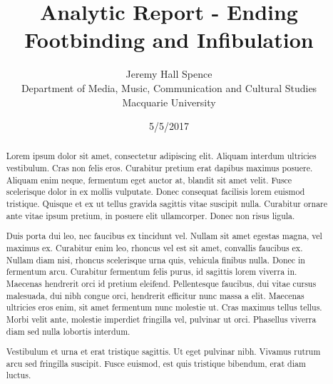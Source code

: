 \documentclass[twoside, 11pt]{article}
\title {Analytic Report - Ending Footbinding and Infibulation}
\date {5/5/2017}
\author {Jeremy Hall Spence \\ Department of Media, Music, Communication and Cultural Studies \\ Macquarie University}
\begin{document}


\maketitle

\cleardoublepage


\tableofcontents

\cleardoublepage


\begin{abstract}

\normalsize

Lorem ipsum dolor sit amet, consectetur adipiscing elit. Aliquam interdum ultricies vestibulum. Cras non felis eros. Curabitur pretium erat dapibus maximus posuere. Aliquam enim neque, fermentum eget auctor at, blandit sit amet velit. Fusce scelerisque dolor in ex mollis vulputate. Donec consequat facilisis lorem euismod tristique. Quisque et ex ut tellus gravida sagittis vitae suscipit nulla. Curabitur ornare ante vitae ipsum pretium, in posuere elit ullamcorper. Donec non risus ligula.

Duis porta dui leo, nec faucibus ex tincidunt vel. Nullam sit amet egestas magna, vel maximus ex. Curabitur enim leo, rhoncus vel est sit amet, convallis faucibus ex. Nullam diam nisi, rhoncus scelerisque urna quis, vehicula finibus nulla. Donec in fermentum arcu. Curabitur fermentum felis purus, id sagittis lorem viverra in. Maecenas hendrerit orci id pretium eleifend. Pellentesque faucibus, dui vitae cursus malesuada, dui nibh congue orci, hendrerit efficitur nunc massa a elit. Maecenas ultricies eros enim, sit amet fermentum nunc molestie ut. Cras maximus tellus tellus. Morbi velit ante, molestie imperdiet fringilla vel, pulvinar ut orci. Phasellus viverra diam sed nulla lobortis interdum.

Vestibulum et urna et erat tristique sagittis. Ut eget pulvinar nibh. Vivamus rutrum arcu sed fringilla suscipit. Fusce euismod, est quis tristique bibendum, erat diam luctus.

\end{abstract}


\end{document}
